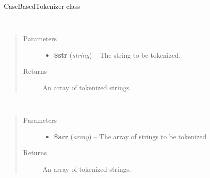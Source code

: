\documentclass[letterpaper,10pt,english]{sphinxmanual}
\begin{document}
\begin{fulllineitems}
\label{docs/api:CaseBasedTokenizer}
CaseBasedTokenizer class

\begin{fulllineitems}
\label{docs/api:CaseBasedTokenizer::tokenizeString}~\begin{quote}\begin{description}
\item[{Parameters}] \leavevmode\begin{itemize}
\item {} 
\textbf{\$str} (\emph{string}) -- The string to be tokenized.

\end{itemize}

\item[{Returns}] \leavevmode
An array of tokenized strings.

\end{description}\end{quote}

\end{fulllineitems}


\begin{fulllineitems}
\label{docs/api:CaseBasedTokenizer::tokenizeArrayOfStrings}~\begin{quote}\begin{description}
\item[{Parameters}] \leavevmode\begin{itemize}
\item {} 
\textbf{\$arr} (\emph{array}) -- The array of strings to be tokenized

\end{itemize}

\item[{Returns}] \leavevmode
An array of tokenized strings.

\end{description}\end{quote}

\end{fulllineitems}


\end{fulllineitems}
\end{document}
